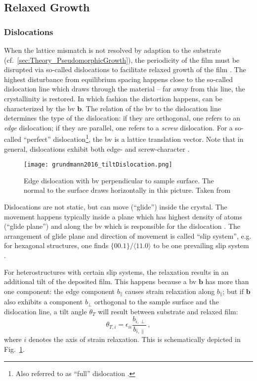 \subsection{Relaxed Growth}
\subsubsection{Dislocations}
When the lattice mismatch is not resolved by adaption to the substrate (cf.~\ref{sec:Theory_PseudomorphicGrowth}), the periodicity of the film must be disrupted via so-called dislocations to facilitate relaxed growth of the film
    \cite{kneiss2021}.
The highest disturbance from equilibrium spacing happens close to the so-called dislocation line which draws through the material --
far away from this line, the crystallinity is restored.
In which fashion the distortion happens, can be characterized by the \gls{bv} $\mathbf{b}$.
The relation of the \gls{bv} to the dislocation line determines the type of the dislocation:
    if they are orthogonal, one refers to an \emph{edge} dislocation;
    if they are parallel, one refers to a \emph{screw} dislocation.
For a so-called \enquote{perfect} dislocation\footnote{
    Also referred to as \enquote{full} dislocation \cite{grundmann2016}.
}, the \gls{bv} is a lattice translation vector.
Note that in general, dislocations exhibit both edge- and screw-character
    \cite{hull2011}.

    \begin{figure}
        \centering
        \texttt{[image: grundmann2016\_tiltDislocation.png]}
        \caption{Edge dislocation with \gls{bv} perpendicular to sample surface. The normal to the surface draws horizontally in this picture. Taken from \textcite{grundmann2016} \tbd}
        \label{fig:Theory_tiltDislocation}
    \end{figure}

Dislocations are not static, but can move (\enquote{glide}) inside the crystal.
The movement happens typically inside a plane which has highest density of atoms (\enquote{glide plane}) and along the \gls{bv} which is responsible for the dislocation
    \cite{hull2011}.
The arrangement of glide plane and direction of movement is called \enquote{slip system}, e.g. for hexagonal structures, one finds $\{00.1\}/\langle11.0\rangle$ to be one prevailing slip system
    \cite{hull2011}.

For heterostructures with certain slip systems, the relaxation results in an additional tilt of the deposited film.
This happens because a \gls{bv} $\textbf{b}$ has more than one component:
the edge component $b_\parallel$ causes strain relaxation along $b_\parallel$;
but if $\mathbf{b}$ also exhibits a component $b_\perp$ orthogonal to the sample surface and the dislocation line, a tilt angle $\theta_T$ will result between substrate and relaxed film:
\begin{equation}\label{equ:Theory_tiltDislocation}
    \theta_{T,i}=\epsilon_{ii}\frac{b_{i,\perp}}{b_{i,\parallel}}\,,
\end{equation}
where $i$ denotes the axis of strain relaxation.
This is schematically depicted in Fig.~\ref{fig:Theory_tiltDislocation}.

